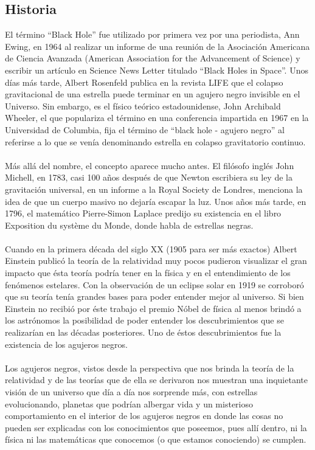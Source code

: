 \documentclass[12pt]{article}
\begin{document}
\subsection{Historia}
El término “Black Hole” fue utilizado por primera vez por una periodista, Ann Ewing, en 1964 al realizar un informe de una reunión de la Asociación Americana de Ciencia Avanzada (American Association for the Advancement of Science) y escribir un artículo en Science News Letter titulado “Black Holes in Space”. Unos días más tarde, Albert Rosenfeld publica en la revista LIFE que el colapso gravitacional de una estrella puede terminar en un agujero negro invisible en el Universo. Sin embargo,  es el físico teórico estadounidense, John Archibald Wheeler, el que populariza el término en una conferencia impartida en 1967 en la Universidad de Columbia, fija el término de “black hole - agujero negro” al referirse a lo que se venía denominando estrella en colapso gravitatorio continuo.
\\\\
Más allá del nombre, el concepto aparece mucho antes. El filósofo inglés John Michell, en 1783, casi 100 años después de que Newton escribiera su ley de la gravitación universal, en un informe a la Royal Society de Londres, menciona la idea de que un cuerpo masivo no dejaría escapar la luz.  Unos años más tarde, en 1796, el matemático Pierre-Simon Laplace predijo su existencia en el libro Exposition du système du Monde, donde habla de estrellas negras.\\\\
Cuando en la primera década del siglo XX (1905 para ser más exactos) Albert Einstein publicó la teoría de la relatividad muy pocos pudieron visualizar el gran impacto que ésta teoría podría tener en la física y en el entendimiento de los fenómenos estelares. Con la observación de un eclipse solar en 1919 se corroboró que su teoría tenía grandes bases para poder entender mejor al universo. Si bien Einstein no recibió por éste trabajo el premio Nóbel de física al menos brindó a los astrónomos la posibilidad de poder entender los descubrimientos que se realizarían en las décadas posteriores. Uno de éstos descubrimientos fue la existencia de los agujeros negros.\\\\
Los agujeros negros, vistos desde la perspectiva que nos brinda la teoría de la relatividad y de las teorías que de ella se derivaron nos muestran una inquietante visión de un universo que día a día nos sorprende más, con estrellas evolucionando, planetas que podrían albergar vida y un misterioso comportamiento en el interior de los agujeros negros en donde las cosas no pueden ser explicadas con los conocimientos que poseemos, pues allí dentro, ni la física ni las matemáticas que conocemos (o que estamos conociendo) se cumplen.\\\\
\end{document}
